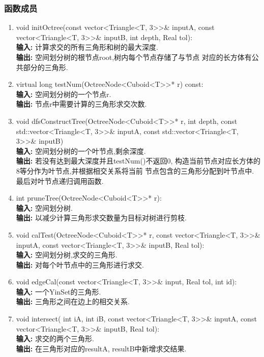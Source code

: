\documentclass[a4paper]{book}
\numberwithin{equation}{chapter}
\theoremstyle{definition}
\begin{document}
\subsubsection{函数成员}
\begin{enumerate}
  \item void initOctree(const vector<Triangle<T, 3>\!>\& inputA,
        const vector<Triangle<T, 3>\!>\& inputB,
        int depth,
        Real tol): \\
        \textbf{输入: }计算求交的所有三角形和树的最大深度. \\
        \textbf{输出: }空间划分树的根节点root,树内每个节点存储了与节点
        对应的长方体有公共部分的三角形.

  \item virtual long testNum(OctreeNode<Cuboid<T>\!>* r)  const: \\
        \textbf{输入: }空间划分树的一个节点r. \\
        \textbf{输出: }节点r中需要计算的三角形求交次数.

  \item void dfsConstructTree(OctreeNode<Cuboid<T>\!>* r,
        int depth,
        const std::vector<Triangle<T, 3>\!>\& inputA,
        const std::vector<Triangle<T, 3>\!>\& inputB) \\
        \textbf{输入: }空间划分树的一个叶节点,剩余深度. \\
        \textbf{输出: }若没有达到最大深度并且testNum()不返回0,
        构造当前节点对应长方体的8等分作为叶节点,并根据相交关系将当前
        节点包含的三角形分配到叶节点中.最后对叶节点递归调用函数.

  \item int pruneTree(OctreeNode<Cuboid<T>>* r): \\
        \textbf{输入: }空间划分树. \\
        \textbf{输出: }以减少计算三角形求交数量为目标对树进行剪枝.

  \item void calTest(OctreeNode<Cuboid<T>\!>* r,
        const vector<Triangle<T, 3>\!>\& inputA,
        const vector<Triangle<T, 3>\!>\& inputB,
        Real tol): \\
        \textbf{输入: }空间划分树,求交的三角形. \\
        \textbf{输出: }对每个叶节点中的三角形进行求交.

  \item void edgeCal(const vector<Triangle<T, 3>\!>\& input,
        Real tol, int id): \\
        \textbf{输入: }一个YinSet的三角形. \\
        \textbf{输出: }三角形之间在边上的相交关系.

  \item void intersect(
        int iA,
        int iB,
        const vector<Triangle<T, 3>\!>\& inputA,
        const vector<Triangle<T, 3>\!>\& inputB,
        Real tol):  \\
        \textbf{输入: }求交的两个三角形. \\
        \textbf{输出: }在三角形对应的resultA, resultB中新增求交结果.
\end{enumerate}
\end{document}
